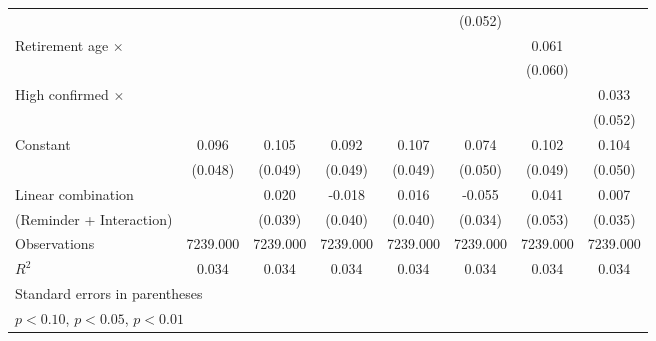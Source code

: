 {\begin{tabular}{l*{7}{c}}
                    &                     &                     &                     &                     &     (0.052)         &                     &                     \\
\addlinespace
Retirement age $\times$&                     &                     &                     &                     &                     &       0.061         &                     \\
                    &                     &                     &                     &                     &                     &     (0.060)         &                     \\
\addlinespace
High confirmed $\times$&                     &                     &                     &                     &                     &                     &       0.033         \\
                    &                     &                     &                     &                     &                     &                     &     (0.052)         \\
\addlinespace
Constant            &       0.096\sym{**} &       0.105\sym{**} &       0.092\sym{*}  &       0.107\sym{**} &       0.074         &       0.102\sym{**} &       0.104\sym{**} \\
                    &     (0.048)         &     (0.049)         &     (0.049)         &     (0.049)         &     (0.050)         &     (0.049)         &     (0.050)         \\
\midrule
Linear combination  &                     &       0.020         &      -0.018         &       0.016         &      -0.055         &       0.041         &       0.007         \\
(Reminder + Interaction)&                     &     (0.039)         &     (0.040)         &     (0.040)         &     (0.034)         &     (0.053)         &     (0.035)         \\
Observations        &    7239.000         &    7239.000         &    7239.000         &    7239.000         &    7239.000         &    7239.000         &    7239.000         \\
\(R^{2}\)           &       0.034         &       0.034         &       0.034         &       0.034         &       0.034         &       0.034         &       0.034         \\
\bottomrule
\multicolumn{8}{l}{\footnotesize Standard errors in parentheses}\\
\multicolumn{8}{l}{\footnotesize \sym{*} \(p<0.10\), \sym{**} \(p<0.05\), \sym{***} \(p<0.01\)}\\
\end{tabular}
}
